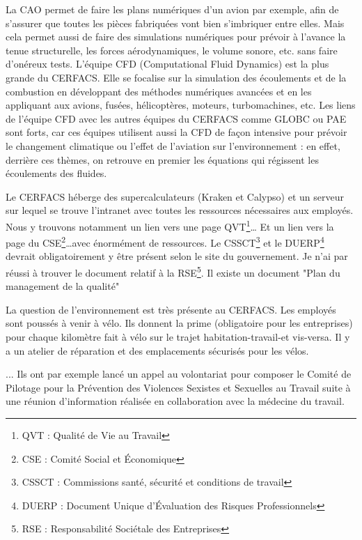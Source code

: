 La CAO permet de faire les plans numériques d'un avion par exemple, afin de s'assurer que toutes les pièces fabriquées vont bien s'imbriquer entre elles. Mais cela permet aussi de faire des simulations numériques pour prévoir à l'avance la tenue structurelle, les forces aérodynamiques, le volume sonore, etc. sans faire d'onéreux tests.
L'équipe CFD (Computational Fluid Dynamics) est la plus grande du CERFACS. Elle se focalise sur la simulation des écoulements et de la combustion en développant des méthodes numériques avancées et en les appliquant aux avions, fusées, hélicoptères, moteurs, turbomachines, etc. Les liens de l’équipe CFD avec les autres équipes du CERFACS comme GLOBC ou PAE  sont forts, car ces équipes utilisent aussi la CFD de façon intensive pour prévoir le changement climatique ou l’effet de l’aviation sur l’environnement : en effet, derrière ces thèmes, on retrouve en premier les équations qui régissent les écoulements des fluides.

Le CERFACS héberge des supercalculateurs (Kraken et Calypso) et un serveur sur lequel se trouve l'intranet avec toutes les ressources nécessaires aux employés.
Nous y trouvons notamment un lien vers une page QVT\footnote{QVT : Qualité de Vie au Travail}\dots
Et un lien vers la page du CSE\footnote{CSE : Comité Social et Économique}\dots avec énormément de ressources.
Le CSSCT\footnote{CSSCT : Commissions santé, sécurité et conditions de travail} et le DUERP\footnote{DUERP : Document Unique d’Évaluation des Risques Professionnels} devrait obligatoirement y être présent selon le site du gouvernement.
Je n'ai par réussi à trouver le document relatif à la RSE\footnote{RSE : Responsabilité Sociétale des Entreprises}.
Il existe un document "Plan du management de la qualité"


La question de l’environnement est très présente au CERFACS. Les employés sont poussés à venir à vélo. Ils donnent la prime (obligatoire pour les entreprises) pour chaque kilomètre fait à vélo sur le trajet habitation-travail-et vis-versa. Il y a un atelier de réparation et des emplacements sécurisés pour les vélos.

... Ils ont par exemple lancé un appel au volontariat pour composer le Comité de Pilotage pour la Prévention des Violences Sexistes et Sexuelles au Travail suite à une réunion d'information réalisée en collaboration avec la médecine du travail.

